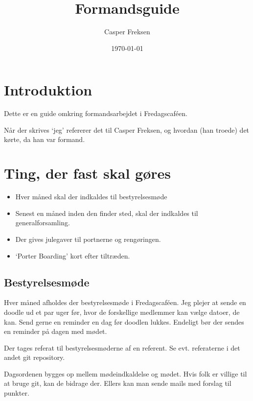 

\title{Formandsguide}
\date{\today}
\author{Casper Freksen}



\maketitle

\section{Introduktion}
\label{sec:introduktion}

Dette er en guide omkring formandsarbejdet i Fredagscaféen.

Når der skrives `jeg' refererer det til Casper Freksen, og hvordan
(han troede) det kørte, da han var formand.

\section{Ting, der fast skal gøres}
\label{sec:ting-der-skal}

\begin{itemize}
\item Hver måned skal der indkaldes til bestyrelsesmøde
\item Senest en måned inden den finder sted, skal der indkaldes til
  generalforsamling.
\item Der gives julegaver til portnerne og rengøringen.
\item `Porter Boarding' kort efter tiltræden.
\end{itemize}

\subsection{Bestyrelsesmøde}
\label{sec:bestyrelsesmode}

Hver måned afholdes der bestyrelsesmøde i Fredagscaféen. Jeg plejer at
sende en doodle ud et par uger før, hvor de forskellige medlemmer kan
vælge datoer, de kan. Send gerne en reminder en dag før doodlen
lukkes. Endeligt bør der sendes en reminder på dagen med mødet.

Der tages referat til bestyrelsesmøderne af en referent. Se
evt. referaterne i det andet git repository.

Dagsordenen bygges op mellem mødeindkaldelse og mødet. Hvis folk er
villige til at bruge git, kan de bidrage der. Ellers kan man sende
mails med forslag til punkter.

